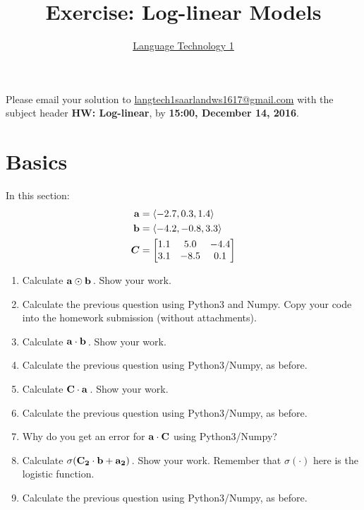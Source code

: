 \documentclass[paper=a4, fontsize=11pt]{article}
\title{Exercise: Log-linear Models}
\author{\href{https://github.com/jonsafari/lt1}{Language Technology 1}}
\date{}
\begin{document}
\maketitle
\begin{spacing}{1.8}

Please email your solution to \url{langtech1saarlandws1617@gmail.com} with the subject header \textbf{HW: Log-linear}, by \textbf{15:00, December 14, 2016}.


\section{Basics}
In this section:
\begin{align}
{\bf a} &= \langle -2.7, 0.3, 1.4 \rangle \\
{\bf b} &= \langle -4.2, -0.8, 3.3 \rangle \\
{\boldsymbol C} &= \begin{bmatrix} 1.1 & 5.0 & -4.4 \\ 3.1 & -8.5 & 0.1 \end{bmatrix}
\end{align}

\begin{enumerate}
	\item Calculate $\bf a \odot b$\,.  Show your work.
	\item Calculate the previous question using Python3 and Numpy.  Copy your code into the homework submission (without attachments).
	\item Calculate $\bf a \cdot b$\,.  Show your work.
	\item Calculate the previous question using Python3/Numpy, as before.
	\item Calculate $\bf C \cdot a$\,.  Show your work.
	\item Calculate the previous question using Python3/Numpy, as before.
	\item Why do you get an error for $\bf a \cdot C$ using Python3/Numpy?
	\item Calculate $\sigma(\bf C_2 \cdot b + a_2)$\,. Show your work. Remember that $\sigma(\cdot)$ here is the logistic function.
	\item Calculate the previous question using Python3/Numpy, as before.
\end{enumerate}


\end{spacing}
\end{document}

